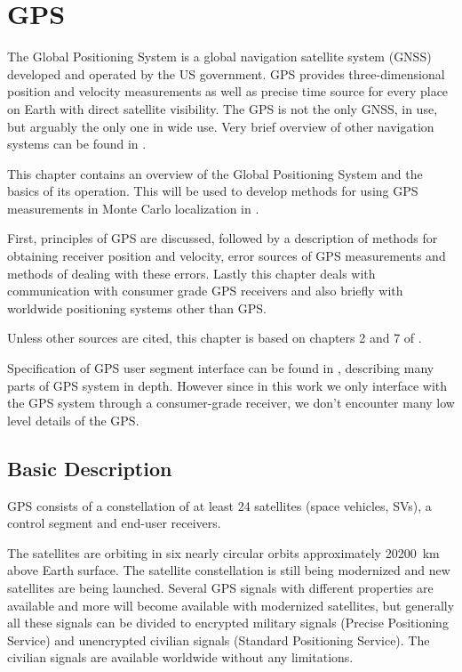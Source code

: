 \chapter{GPS}
\label{chap:gps}

The Global Positioning System is a global navigation satellite system (GNSS)
developed and operated by the US government.
GPS provides three-dimensional position and velocity measurements as well as
precise time source for every place on Earth with direct satellite visibility.
The GPS is not the only GNSS, in use, but arguably the only one in wide use.
Very brief overview of other navigation systems can be found in .

This chapter contains an overview of the Global Positioning System and
the basics of its operation.
This will be used to develop methods for using GPS
measurements in Monte Carlo localization in .

First, principles of GPS are discussed, followed by a description of methods for
obtaining receiver position and velocity,
error sources of GPS measurements and methods of dealing with these errors.
Lastly this chapter deals with communication with consumer grade GPS receivers
and also briefly with worldwide positioning systems other than GPS.

Unless other sources are cited, this chapter is based on chapters
2 and 7 of \cite{kaplan06}.

Specification of GPS user segment interface can be found in \cite{fyfe92},
describing many parts of GPS system in depth.
However since in this work we only interface with the GPS system through a
consumer-grade receiver, we don't encounter many low level details of
the GPS.

\section{Basic Description}
GPS consists of a constellation of at least 24 satellites (space vehicles, SVs),
a control segment and end-user receivers.

The satellites are orbiting in six nearly circular orbits approximately \SI{20200}{\kilo\meter}
above Earth surface.
The satellite constellation is still being modernized \cite{gps-modernization-www}
and new satellites are being launched.
Several GPS signals with different properties are available and more will become available
with modernized satellites,
but generally all these signals can be divided to encrypted military signals 
(Precise Positioning Service) and unencrypted
civilian signals (Standard Positioning Service).
The civilian signals are available worldwide without any limitations.


